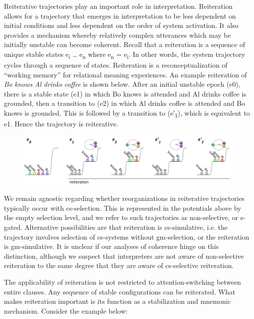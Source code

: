  Reiterative trajectories play an important role in interpretation. Reiteration allows for a trajectory that emerges in interpretation to be less dependent on initial conditions and less dependent on the order of system activation. It also provides a mechanism whereby relatively complex utterances which may be initially unstable can become coherent. Recall that a reiteration is a sequence of unique stable states e\textsubscript{i} … e\textsubscript{n} where e\textsubscript{n} = e\textsubscript{i}. In other words, the system trajectory cycles through a sequence of states. Reiteration is a reconceptualization of “working memory” for relational meaning experiences. An example reiteration of \textit{Bo} \textit{knows} \textit{Al} \textit{drinks} \textit{coffee} is shown below. After an initial unstable epoch (e0), there is a stable state (e1) in which {\textbar}Bo knows{\textbar} is attended and {\textbar}Al drinks coffee{\textbar} is grounded, then a transition to (e2) in which {\textbar}Al drinks coffee{\textbar} is attended and {\textbar}Bo knows{\textbar} is grounded. This is followed by a transition to (e′\textsubscript{1}), which is equivalent to e1. Hence the trajectory is reiterative.

  
\begin{figure}
\includegraphics[width=\textwidth]{figures/Tilsen-img122.png}
\caption{\missingcaption}
\label{fig:}
\end{figure}
 

  We remain agnostic regarding whether reorganizations in reiterative trajectories typically occur with cs-selection. This is represented in the potentials above by the empty selection level, and we refer to such trajectories as non-selective, or s-gated. Alternative possibilities are that reiteration is cs-simulative, i.e. the trajectory involves selection of cs-systems without gm-selection, or the reiteration is gm-simulative. It is unclear if our analyses of coherence hinge on this distinction, although we suspect that interpreters are not aware of non-selective reiteration to the same degree that they are aware of cs-selective reiteration.  

  The applicability of reiteration is not restricted to attention-switching between entire clauses. Any sequence of stable configurations can be reiterated. What makes reiteration important is its function as a stabilization and mnemonic mechanism. Consider the example below:  

